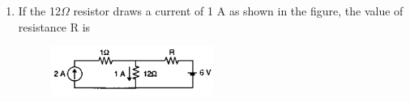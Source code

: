 \documentclass[12pt]{article}
\theoremstyle{remark}
\begin{document}
\begin{enumerate}
\item If the 12$\Omega$ resistor draws a current of 1 A as shown in the figure, the value of resistance R is
\begin{figure}[H]
    \centering
    \includegraphics[width=0.5\textwidth]{Figs/Q33.png}
    \caption{}
    \label{fig:1.22}
\end{figure}
\begin{enumerate}
\end{enumerate}
\hfill{}


\end{enumerate}
\end{document}
